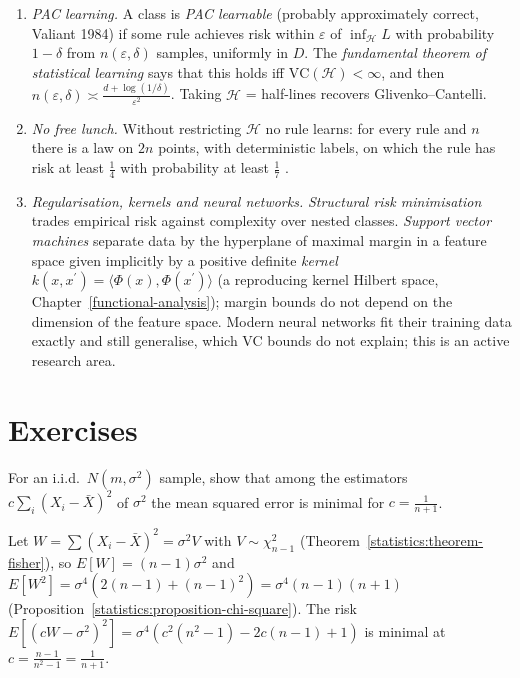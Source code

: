 \begin{remark}\label{statistics:remark-learning}
\begin{enumerate}
\item \emph{PAC learning.} A class is \emph{PAC learnable} (probably approximately correct, Valiant 1984) if some rule achieves risk within $\varepsilon$ of $\inf_{\mathcal{H}}L$ with probability $1 - \delta$ from $n(\varepsilon, \delta)$ samples, uniformly in
$D$. The \emph{fundamental theorem of statistical learning} says that this holds iff $\mathrm{VC}(\mathcal{H}) < \infty$, and then $n(\varepsilon, \delta) \asymp \frac{d + \log(1/\delta)}{\varepsilon^2}$. Taking $\mathcal{H}$ = half-lines recovers
Glivenko--Cantelli.
\item \emph{No free lunch.} Without restricting $\mathcal{H}$ no rule learns: for every rule and $n$ there is a law on $2n$ points, with deterministic labels, on which the rule has risk at least $\frac14$ with probability at least
$\frac17$ \cite{shalev-shwartz-ben-david}.
\item \emph{Regularisation, kernels and neural networks.} \emph{Structural risk minimisation} trades empirical risk against complexity over nested classes. \emph{Support vector machines} separate data by the hyperplane of
maximal margin in a feature space given implicitly by a positive definite \emph{kernel} $k(x, x^{\prime}) = \langle\Phi(x), \Phi(x^{\prime})\rangle$ (a reproducing kernel Hilbert space, Chapter~\ref{functional-analysis}); margin bounds do not
depend on the dimension of the feature space. Modern neural networks fit their training data exactly and still generalise, which VC bounds do not explain; this is an active research area.
\end{enumerate}
\end{remark}

\section{Exercises}\label{statistics:section-exercises}

\begin{exercise}\label{statistics:exercise-variance-mse}
For an i.i.d.\ $N(m, \sigma^2)$ sample, show that among the estimators $c\sum_i(X_i - \bar X)^2$ of $\sigma^2$ the mean squared error is minimal for $c = \frac{1}{n + 1}$.
\end{exercise}

\begin{solution}
Let $W = \sum(X_i - \bar X)^2 = \sigma^2V$ with $V \sim \chi^2_{n-1}$ (Theorem~\ref{statistics:theorem-fisher}), so $E[W] = (n - 1)\sigma^2$ and $E[W^2] = \sigma^4(2(n - 1) + (n - 1)^2) = \sigma^4(n - 1)(n + 1)$
(Proposition~\ref{statistics:proposition-chi-square}). The risk $E[(cW - \sigma^2)^2] = \sigma^4(c^2(n^2 - 1) - 2c(n - 1) + 1)$ is minimal at $c = \frac{n - 1}{n^2 - 1} = \frac{1}{n + 1}$.
\end{solution}

